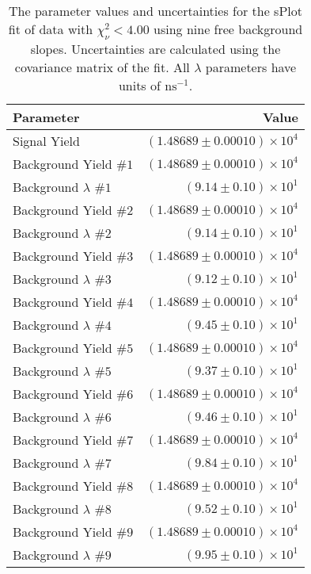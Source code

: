 
\begin{table}[ht]
    \begin{center}
        \begin{tabular}{lr}\toprule
            Parameter & Value \\\midrule
            Signal Yield & $(1.48689 \pm 0.00010) \times 10^{4}$ \\
            Background Yield $\#1$ & $(1.48689 \pm 0.00010) \times 10^{4}$ \\
            Background $\lambda$ $\#1$ & $(9.14 \pm 0.10) \times 10^{1}$ \\
            Background Yield $\#2$ & $(1.48689 \pm 0.00010) \times 10^{4}$ \\
            Background $\lambda$ $\#2$ & $(9.14 \pm 0.10) \times 10^{1}$ \\
            Background Yield $\#3$ & $(1.48689 \pm 0.00010) \times 10^{4}$ \\
            Background $\lambda$ $\#3$ & $(9.12 \pm 0.10) \times 10^{1}$ \\
            Background Yield $\#4$ & $(1.48689 \pm 0.00010) \times 10^{4}$ \\
            Background $\lambda$ $\#4$ & $(9.45 \pm 0.10) \times 10^{1}$ \\
            Background Yield $\#5$ & $(1.48689 \pm 0.00010) \times 10^{4}$ \\
            Background $\lambda$ $\#5$ & $(9.37 \pm 0.10) \times 10^{1}$ \\
            Background Yield $\#6$ & $(1.48689 \pm 0.00010) \times 10^{4}$ \\
            Background $\lambda$ $\#6$ & $(9.46 \pm 0.10) \times 10^{1}$ \\
            Background Yield $\#7$ & $(1.48689 \pm 0.00010) \times 10^{4}$ \\
            Background $\lambda$ $\#7$ & $(9.84 \pm 0.10) \times 10^{1}$ \\
            Background Yield $\#8$ & $(1.48689 \pm 0.00010) \times 10^{4}$ \\
            Background $\lambda$ $\#8$ & $(9.52 \pm 0.10) \times 10^{1}$ \\
            Background Yield $\#9$ & $(1.48689 \pm 0.00010) \times 10^{4}$ \\
            Background $\lambda$ $\#9$ & $(9.95 \pm 0.10) \times 10^{1}$ \\\bottomrule
        \end{tabular}
        \caption{The parameter values and uncertainties for the sPlot fit of data with $\chi^2_\nu < 4.00$ using nine free background slopes. Uncertainties are calculated using the covariance matrix of the fit. All $\lambda$ parameters have units of $\si{\nano\second}^{-1}$.}\label{tab:splot-fit-results-chisqdof-4.00-free-9}
    \end{center}
\end{table}
